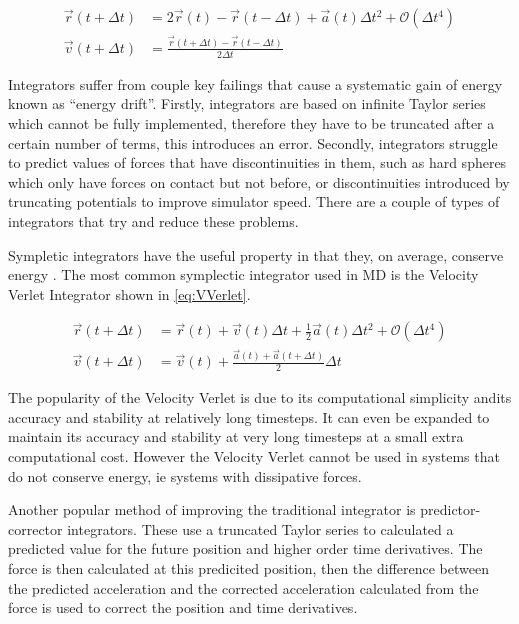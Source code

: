\documentclass[12pt]{UoAthesis}
\begin{document}
\begin{subequations} 
  \begin{align} 
    \vec{r}(t + \Delta t) &= 2\vec{r}(t) - \vec{r}(t - \Delta t) 
    + \vec{a}(t)\Delta t^2 + \mathcal{O}(\Delta t^4)
    \label{eq:Verletpos} \\
    \vec{v}(t+\Delta t) &= \frac{\vec{r}(t+\Delta t) -
      \vec{r}(t-\Delta t)}{2\Delta t} 
    \label{eq:VerletVel} 
  \end{align}
\end{subequations}

Integrators suffer from couple key failings that cause a systematic
gain of energy known as ``energy drift''. Firstly, integrators are
based on infinite Taylor series which cannot be fully implemented,
therefore they have to be truncated after a certain number of terms,
this introduces an error. Secondly, integrators struggle to predict
values of forces that have discontinuities in them, such as hard
spheres which only have forces on contact but not before, or
discontinuities introduced by truncating potentials to improve
simulator speed.  There are a couple of types of integrators that try
and reduce these problems.

Sympletic integrators have the useful property in that they, on
average, conserve energy \cite{Hairer2003}. The most common symplectic
integrator used in MD is the Velocity Verlet Integrator
\cite{Swope1982} shown in \eqref{eq:VVerlet}.

\begin{subequations}
\label{eq:VVerlet}
\begin{align}
 \vec{r}(t + \Delta t) &= \vec{r}(t) + \vec{v}(t) \Delta t 
 + \frac{1}{2}\vec{a}(t) \Delta t^2 + \mathcal{O}(\Delta t^4)
 \label{eq:VVerletpos} \\
 \vec{v}(t+\Delta t) &= \vec{v}(t) + \frac{\vec{a}(t) 
   + \vec{a}(t+\Delta t)}{2}\Delta t
 \label{eq:VVerletVel}
\end{align}
\end{subequations}

The popularity of the Velocity Verlet is due to its computational
simplicity andits accuracy and stability at relatively long
timesteps. It can even be expanded\cite{Khakimov2002} to maintain its
accuracy and stability at very long timesteps at a small extra
computational cost. However the Velocity Verlet cannot be used in
systems that do not conserve energy, ie systems with dissipative
forces.

Another popular method of improving the traditional integrator is
predictor-corrector integrators. These use a truncated Taylor series
to calculated a predicted value for the future position and higher
order time derivatives. The force is then calculated at this
predicited position, then the difference between the predicted
acceleration and the corrected acceleration calculated from the force
is used to correct the position and time derivatives.
\end{document}
